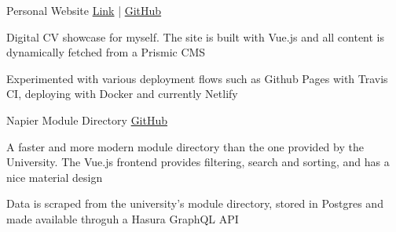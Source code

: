 

\begin{cventries}
  \cvprojectentry
    {Personal Website} %
    {} %
    {\href{https://eriksanne.com}{Link} | \href{https://github.com/ersanne/portfolio-website}{GitHub}} %
    {} %
    {
      \begin{cvitems} %
        \item {Digital CV showcase for myself. The site is built with Vue.js and all content is dynamically fetched from a Prismic CMS}
        \item {Experimented with various deployment flows such as Github Pages with Travis CI, deploying with Docker and currently Netlify}
      \end{cvitems}
    }


  \cvprojectentry
    {Napier Module Directory} %
    {} %
    {\href{https://github.com/ersanne/napiermodules}{GitHub}} %
    {} %
    {
      \begin{cvitems} %
        \item {A faster and more modern module directory than the one provided by the University. The Vue.js frontend provides filtering, search and sorting, and has a nice material design}
        \item {Data is scraped from the university's module directory, stored in Postgres and made available throguh a Hasura GraphQL API}
      \end{cvitems}
    }

\end{cventries}
